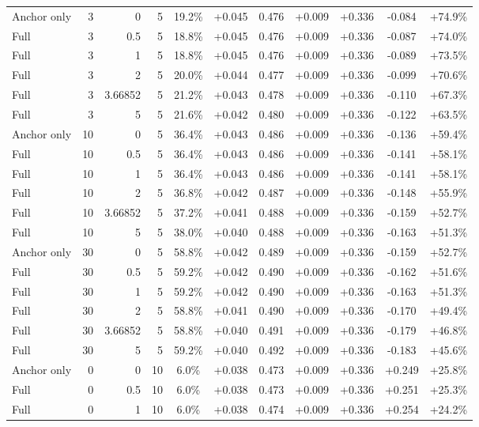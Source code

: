 \begin{table}[htbp]
\begin{tabular}{lrrrccccccc}
Anchor only & 3 & 0 & 5 & 19.2\% & +0.045 & 0.476 & +0.009 & +0.336 & -0.084 & +74.9\% \\
Full & 3 & 0.5 & 5 & 18.8\% & +0.045 & 0.476 & +0.009 & +0.336 & -0.087 & +74.0\% \\
Full & 3 & 1 & 5 & 18.8\% & +0.045 & 0.476 & +0.009 & +0.336 & -0.089 & +73.5\% \\
Full & 3 & 2 & 5 & 20.0\% & +0.044 & 0.477 & +0.009 & +0.336 & -0.099 & +70.6\% \\
Full & 3 & 3.66852 & 5 & 21.2\% & +0.043 & 0.478 & +0.009 & +0.336 & -0.110 & +67.3\% \\
Full & 3 & 5 & 5 & 21.6\% & +0.042 & 0.480 & +0.009 & +0.336 & -0.122 & +63.5\% \\
Anchor only & 10 & 0 & 5 & 36.4\% & +0.043 & 0.486 & +0.009 & +0.336 & -0.136 & +59.4\% \\
Full & 10 & 0.5 & 5 & 36.4\% & +0.043 & 0.486 & +0.009 & +0.336 & -0.141 & +58.1\% \\
Full & 10 & 1 & 5 & 36.4\% & +0.043 & 0.486 & +0.009 & +0.336 & -0.141 & +58.1\% \\
Full & 10 & 2 & 5 & 36.8\% & +0.042 & 0.487 & +0.009 & +0.336 & -0.148 & +55.9\% \\
Full & 10 & 3.66852 & 5 & 37.2\% & +0.041 & 0.488 & +0.009 & +0.336 & -0.159 & +52.7\% \\
Full & 10 & 5 & 5 & 38.0\% & +0.040 & 0.488 & +0.009 & +0.336 & -0.163 & +51.3\% \\
Anchor only & 30 & 0 & 5 & 58.8\% & +0.042 & 0.489 & +0.009 & +0.336 & -0.159 & +52.7\% \\
Full & 30 & 0.5 & 5 & 59.2\% & +0.042 & 0.490 & +0.009 & +0.336 & -0.162 & +51.6\% \\
Full & 30 & 1 & 5 & 59.2\% & +0.042 & 0.490 & +0.009 & +0.336 & -0.163 & +51.3\% \\
Full & 30 & 2 & 5 & 58.8\% & +0.041 & 0.490 & +0.009 & +0.336 & -0.170 & +49.4\% \\
Full & 30 & 3.66852 & 5 & 58.8\% & +0.040 & 0.491 & +0.009 & +0.336 & -0.179 & +46.8\% \\
Full & 30 & 5 & 5 & 59.2\% & +0.040 & 0.492 & +0.009 & +0.336 & -0.183 & +45.6\% \\
Anchor only & 0 & 0 & 10 & 6.0\% & +0.038 & 0.473 & +0.009 & +0.336 & +0.249 & +25.8\% \\
Full & 0 & 0.5 & 10 & 6.0\% & +0.038 & 0.473 & +0.009 & +0.336 & +0.251 & +25.3\% \\
Full & 0 & 1 & 10 & 6.0\% & +0.038 & 0.474 & +0.009 & +0.336 & +0.254 & +24.2\% \\

\end{tabular}
\end{table}
